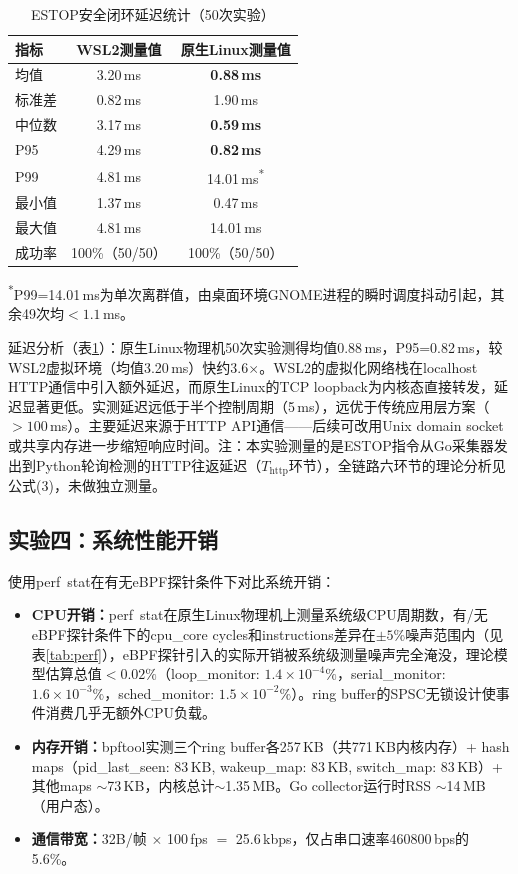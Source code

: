 \documentclass{rjthesis}
\begin{document}
\begin{table}[h]
    \centering
    \caption{ESTOP安全闭环延迟统计（50次实验）}
    \label{tab:estop}
    \small
    \begin{tabular}{l c c}
        \toprule
        指标 & WSL2测量值 & 原生Linux测量值 \\
        \midrule
        均值 & 3.20\,ms & \textbf{0.88\,ms} \\
        标准差 & 0.82\,ms & 1.90\,ms \\
        中位数 & 3.17\,ms & \textbf{0.59\,ms} \\
        P95 & 4.29\,ms & \textbf{0.82\,ms} \\
        P99 & 4.81\,ms & 14.01\,ms\textsuperscript{*} \\
        最小值 & 1.37\,ms & 0.47\,ms \\
        最大值 & 4.81\,ms & 14.01\,ms \\
        成功率 & 100\%（50/50） & 100\%（50/50） \\
        \bottomrule
    \end{tabular}

    \textsuperscript{*}P99=14.01\,ms为单次离群值，由桌面环境GNOME进程的瞬时调度抖动引起，其余49次均$<1.1$\,ms。
\end{table}

延迟分析（表\ref{tab:estop}）：原生Linux物理机50次实验测得均值0.88\,ms，P95=0.82\,ms，较WSL2虚拟环境（均值3.20\,ms）快约3.6$\times$。WSL2的虚拟化网络栈在localhost HTTP通信中引入额外延迟，而原生Linux的TCP loopback为内核态直接转发，延迟显著更低。实测延迟远低于半个控制周期（5\,ms），远优于传统应用层方案（$>\!100$\,ms）。主要延迟来源于HTTP API通信——后续可改用Unix domain socket或共享内存进一步缩短响应时间。注：本实验测量的是ESTOP指令从Go采集器发出到Python轮询检测的HTTP往返延迟（$T_{\text{http}}$环节），全链路六环节的理论分析见公式(3)，未做独立测量。

\subsection{实验四：系统性能开销}

使用perf~stat在有无eBPF探针条件下对比系统开销：

\begin{itemize}
    \item \textbf{CPU开销：}perf~stat在原生Linux物理机上测量系统级CPU周期数，有/无eBPF探针条件下的cpu\_core cycles和instructions差异在$\pm 5\%$噪声范围内（见表\ref{tab:perf}），eBPF探针引入的实际开销被系统级测量噪声完全淹没，理论模型估算总值$<0.02\%$（loop\_monitor: $1.4\!\times\!10^{-4}\%$，serial\_monitor: $1.6\!\times\!10^{-3}\%$，sched\_monitor: $1.5\!\times\!10^{-2}\%$）。ring buffer的SPSC无锁设计\cite{gregg2019}使事件消费几乎无额外CPU负载。
    \item \textbf{内存开销：}bpftool实测三个ring buffer各257\,KB（共771\,KB内核内存）+ hash maps（pid\_last\_seen: 83\,KB, wakeup\_map: 83\,KB, switch\_map: 83\,KB）+ 其他maps $\sim$73\,KB，内核总计$\sim$1.35\,MB。Go collector运行时RSS $\sim$14\,MB（用户态）。
    \item \textbf{通信带宽：}32B/帧 $\times$ 100\,fps $=$ 25.6\,kbps，仅占串口速率460800\,bps的5.6\%。
\end{itemize}
\end{document}
